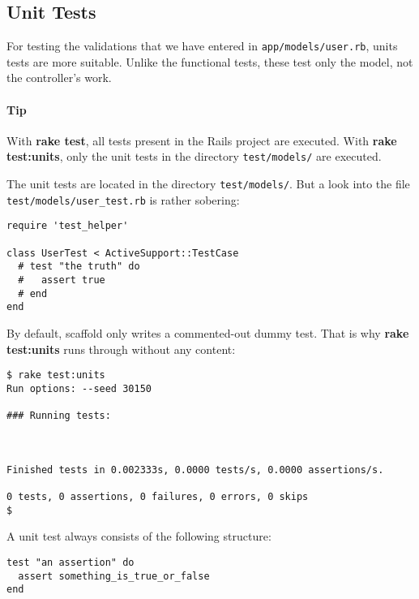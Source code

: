 \documentclass[a4paper]{book}
\newcounter{tab}[chapter]
\begin{document}
\subsection{Unit Tests}\label{unit-tests}

For testing the validations that we have entered in \texttt{app/models/user.rb}, units tests are more suitable. Unlike the functional tests, these test only the model, not the controller's work.

\paragraph{Tip}\label{tip-16}

With \textbf{rake test}, all tests present in the Rails project are executed. With \textbf{rake test:units}, only the unit tests in the directory \texttt{test/models/} are executed.

The unit tests are located in the directory \texttt{test/models/}. But a look into the file \texttt{test/models/user\_test.rb} is rather sobering:

\begin{shaded}\begin{verbatim}
require 'test_helper'

class UserTest < ActiveSupport::TestCase
  # test "the truth" do
  #   assert true
  # end
end
\end{verbatim}\end{shaded}

By default, scaffold only writes a commented-out dummy test. That is why \textbf{rake test:units} runs through without any content:

\begin{shaded}\begin{verbatim}
$ rake test:units
Run options: --seed 30150

### Running tests:



Finished tests in 0.002333s, 0.0000 tests/s, 0.0000 assertions/s.

0 tests, 0 assertions, 0 failures, 0 errors, 0 skips
$
\end{verbatim}\end{shaded}

A unit test always consists of the following structure:

\begin{shaded}\begin{verbatim}
test "an assertion" do
  assert something_is_true_or_false
end
\end{verbatim}\end{shaded}
\end{document}
